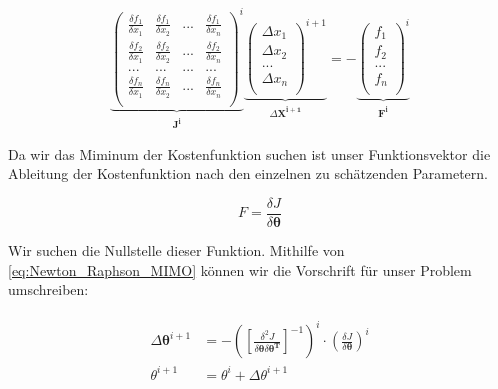  \begin{equation}
	\underbrace{\begin{pmatrix}
	\frac{\delta f_{1}}{\delta x_{1}} & \frac{\delta f_{1}}{\delta x_{2}} & ... & \frac{\delta f_{1}}    		{\delta x_{n}}\\
	\frac{\delta f_{2}}{\delta x_{1}} & \frac{\delta f_{2}}{\delta x_{2}} & ... & \frac{\delta f_{2}}			{\delta x_{n}}\\
	... & ... & ... & ...\\
	\frac{\delta f_{n}}{\delta x_{1}} & \frac{\delta f_{n}}{\delta x_{2}} & ... & \frac{\delta f_{n}}			{\delta x_{n}}\\
	\end{pmatrix}^{i}}_{\substack{\mathbf{J^{i}}}}
	\underbrace{\begin{pmatrix}
	\Delta x_{1}\\
	\Delta x_{2}\\
	...\\
	\Delta x_{n}\\
	\end{pmatrix}^{i+1}}_{\substack{\Delta \mathbf{X^{i+1}}}} = -
	\underbrace{\begin{pmatrix}
	f_{1}\\
	f_{2}\\
	...\\
	f_{n}\\
	\end{pmatrix}^{i}}_{\substack{\mathbf{F^{i}}}}
	\label{eq:Newton_Raphson_MIMO}
\end{equation} 

Da wir das Miminum der Kostenfunktion suchen ist unser Funktionsvektor die Ableitung der Kostenfunktion nach den einzelnen zu schätzenden Parametern. 

\begin{equation}
	{F} = \frac{\delta J}{\delta \mathbf{\theta}}
	\label{eq:Newton_Raphson_1}
\end{equation}

Wir suchen die Nullstelle dieser Funktion. Mithilfe von \cref{eq:Newton_Raphson_MIMO} können wir die Vorschrift für 
unser Problem umschreiben:

\begin{align}
	\begin{split}
		\Delta \mathbf{\theta}^{i+1} &= -\left(\left[  \frac{\delta^{2}J}{\delta \mathbf{\theta} \delta 
		\mathbf{\theta^T}}\right]^{-1} \right)^{i} \cdot \left(\frac{\delta J}{\delta \mathbf{\theta}}\right)^{i} \\
		\theta^{i+1} &= \theta^{i} + \Delta\theta^{i+1}
		\label{eq:Newton_Raphson_2}
	\end{split}
\end{align}

